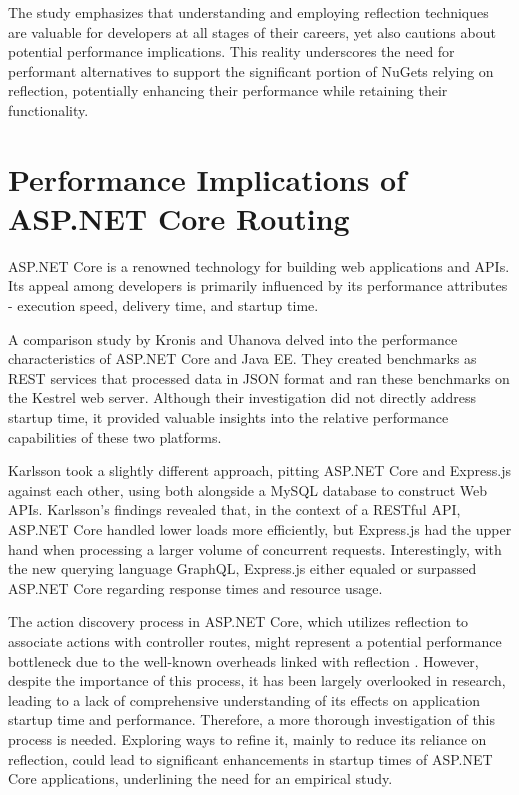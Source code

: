 The study \cite{Beaumont2022} emphasizes that understanding and employing reflection techniques are valuable for developers at all stages of their careers, yet also cautions about potential performance implications. This reality underscores the need for performant alternatives to support the significant portion of NuGets relying on reflection, potentially enhancing their performance while retaining their functionality.

\section{Performance Implications of ASP.NET Core Routing}

ASP.NET Core is a renowned technology for building web applications and APIs. Its appeal among developers is primarily influenced by its performance attributes - execution speed, delivery time, and startup time.

A comparison study by Kronis and Uhanova \cite{Kronis2018} delved into the performance characteristics of ASP.NET Core and Java EE. They created benchmarks as REST services that processed data in JSON format and ran these benchmarks on the Kestrel web server. Although their investigation did not directly address startup time, it provided valuable insights into the relative performance capabilities of these two platforms.

Karlsson \cite{Karlsson2021} took a slightly different approach, pitting ASP.NET Core and Express.js against each other, using both alongside a MySQL database to construct Web APIs. Karlsson's findings revealed that, in the context of a RESTful API, ASP.NET Core handled lower loads more efficiently, but Express.js had the upper hand when processing a larger volume of concurrent requests. Interestingly, with the new querying language GraphQL, Express.js either equaled or surpassed ASP.NET Core regarding response times and resource usage.

The action discovery process in ASP.NET Core, which utilizes reflection to associate actions with controller routes, might represent a potential performance bottleneck due to the well-known overheads linked with reflection \cite{Beaumont2022}. However, despite the importance of this process, it has been largely overlooked in research, leading to a lack of comprehensive understanding of its effects on application startup time and performance. Therefore, a more thorough investigation of this process is needed. Exploring ways to refine it, mainly to reduce its reliance on reflection, could lead to significant enhancements in startup times of ASP.NET Core applications, underlining the need for an empirical study.

